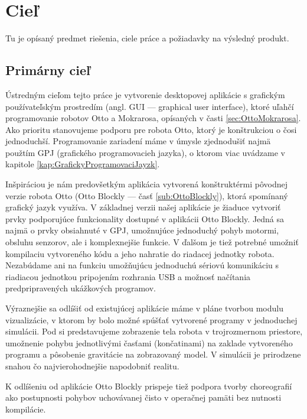\chapter{Cieľ}

\label{kap:ciel}

Tu je opísaný predmet riešenia, ciele práce a požiadavky na výsledný produkt.

\section{Primárny cieľ}
Ústredným cieľom tejto práce je vytvorenie desktopovej aplikácie s grafickým používateľským prostredím (angl. GUI --- graphical user interface), ktoré uľahčí programovanie robotov Otto a Mokrarosa, opísaných v časti \ref{sec:OttoMokrarosa}. Ako prioritu stanovujeme podporu pre robota Otto, ktorý je konštrukciou o čosi jednoduchší. Programovanie zariadení máme v úmysle zjednodušiť najmä použtím GPJ (grafického programovacieh jazyka), o ktorom viac uvádzame v kapitole \ref{kap:GrafickyProgramovaciJayzk}.

Inšpiráciou je nám predovšetkým aplikácia vytvorená konštruktérmi pôvodnej verzie robota Otto (Otto Blockly --- časť \ref{sub:OttoBlockly}), ktorá spomínaný grafický jazyk využíva. V základnej verzii našej aplikácie je žiaduce vytvoriť prvky podporujúce funkcionality dostupné v aplikácii Otto Blockly. Jedná sa najmä o prvky obsiahnuté v GPJ, umožnujúce jednoduchý pohyb motormi, obsluhu senzorov, ale i komplexnejšie funkcie. V ďalšom je tiež potrebné umožniť kompilaciu vytvoreného kódu a jeho nahratie do riadacej jednotky robota. Nezabúdame ani na funkciu umožňujúcu jednoduchú sériovú komunikáciu s riadiacou jednotkou pripojením rozhrania USB a možnosť načítania predpripravených ukážkových programov.

Výraznejšie sa odlíšiť od existujúcej aplikácie máme v pláne tvorbou modulu vizualizácie, v ktorom by bolo možné spúšťať vytvorené programy v jednoduchej simulácii. Pod  si predstavujeme zobrazenie tela robota v trojrozmernom priestore, umožnenie pohybu jednotlivými časťami (končatinami) na zaklade vytvoreného programu a pôsobenie gravitácie na zobrazovaný model. V simulácii je prirodzene snahou čo najvierohodnejšie napodobniť realitu.

K odlíšeniu od aplikácie Otto Blockly prispeje tiež podpora tvorby choreografií ako postupnosti pohybov uchovávanej čisto v operačnej pamäti bez nutnosti kompilácie.

